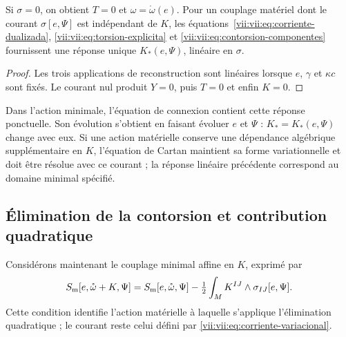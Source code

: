 \begin{corollary}
\label{vii:vii:cor:desacoplamiento-torsional}
Si \(\sigma=0\), on obtient \(T=0\) et \(\omega=\mathring\omega(e)\). Pour un couplage matériel dont le courant \(\sigma[e,\Psi]\) est indépendant de \(K\), les équations~\eqref{vii:vii:eq:corriente-dualizada}, \eqref{vii:vii:eq:torsion-explicita} et \eqref{vii:vii:eq:contorsion-componentes} fournissent une réponse unique \(K_*(e,\Psi)\), linéaire en \(\sigma\).
\end{corollary}
\begin{proof}
Les trois applications de reconstruction sont linéaires lorsque \(e\),
\(\gamma\) et \(\kappa c\) sont fixés. Le courant nul produit
\(Y=0\), puis \(T=0\) et enfin \(K=0\).
\end{proof}

Dans l'action minimale, l'équation de connexion contient cette réponse
ponctuelle. Son évolution s'obtient en faisant évoluer \(e\) et \(\Psi\) :
\(K_*=K_*(e,\Psi)\) change avec eux. Si une action matérielle conserve
une dépendance algébrique supplémentaire en \(K\), l'équation de Cartan
maintient sa forme variationnelle et doit être résolue avec ce courant ;
la réponse linéaire précédente correspond au domaine minimal spécifié.

\subsection{Élimination de la contorsion et contribution quadratique}
\label{vii:vii:subsec:respuesta-cuadratica}

Considérons maintenant le couplage minimal affine en \(K\), exprimé par
\begin{equation}
 S_{\rm m}[e,\mathring\omega+K,\Psi]
 =S_{\rm m}[e,\mathring\omega,\Psi]
   -\tfrac12\int_M K^{IJ}\wedge\sigma_{IJ}[e,\Psi].
 \label{vii:vii:eq:materia-afin-contorsion}
\end{equation}
Cette condition identifie l'action matérielle à laquelle s'applique
l'élimination quadratique ; le courant reste celui défini par
\eqref{vii:vii:eq:corriente-variacional}.

